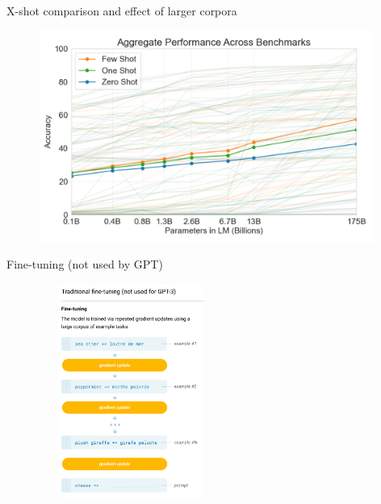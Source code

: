\begin{vbframe}{X-shot comparison and effect of larger corpora}

\vfill

	\begin{figure}
		\centering
		\includegraphics[width=11cm]{figure/xshotlargecorpora.png}
	\end{figure}

\vfill

\end{vbframe}


\begin{vbframe}{Fine-tuning (not used by GPT)}

\vfill

	\begin{figure}
		\centering
		\includegraphics[height=7cm,width=6cm]{figure/gptnofinetuning.png}
	\end{figure}

\vfill

\end{vbframe}


